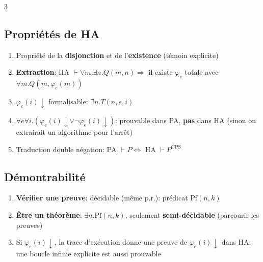 \documentclass[12pt, a4paper]{article}
\newcommand{\dv}{{\downarrow}}
\newcommand{\ff}{\varphi}
\newcommand{\vd}{\vdash}
\begin{document}
\begin{multicols*}{3}
	\colbreak
	\subsection{Propriétés de HA}
	\begin{enumerate}[\roman*.]
		\item Propriété de la \textbf{disjonction} et de l'\textbf{existence} (témoin explicite)
		\item \textbf{Extraction}: HA $\vd\forall m.\exists n.Q(m,n)\Rightarrow$ il existe $\ff_e$ totale avec $\forall m.Q(m,\ff_e(m))$
		\item $\ff_e(i)\dv$ formalisable: $\exists n.T(n,e,i)$
		\item $\forall e\forall i.(\ff_e(i)\dv\vee\neg\ff_e(i)\dv)$: prouvable dans PA, \textbf{pas} dans HA (sinon on extrairait un algorithme pour l'arrêt)
		\item Traduction double négation: PA $\vd P\iff$ HA $\vd P^{\text{CPS}}$
	\end{enumerate}

	\subsection{Démontrabilité}
	\begin{enumerate}[\roman*.]
		\item \textbf{Vérifier une preuve}: décidable (même p.r.): prédicat $\text{Pf}(n,k)$
		\item \textbf{Être un théorème}: $\exists n.\text{Pf}(n,k)$, seulement \textbf{semi-décidable} (parcourir les preuves)
		\item Si $\ff_e(i)\dv$, la trace d'exécution donne une preuve de $\ff_e(i)\dv$ dans HA; une boucle infinie explicite est aussi prouvable
	\end{enumerate}


\end{multicols*}
\end{document}
